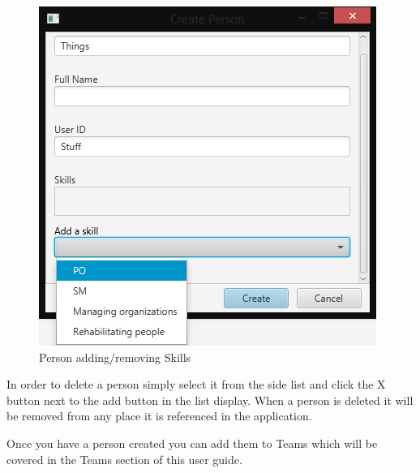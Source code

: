 \begin{figure}[H]
\centering
\includegraphics[width=\textwidth]{images/screenshots/people3.PNG}
\caption{Person adding/removing Skills}
\label{fig:new_project}
\end{figure}

In order to delete a person simply select it from the side list and click the X button next to the add button in the list display. When a person is deleted it will be removed from any place it is referenced in the application.

Once you have a person created you can add them to Teams which will be covered in the Teams section of this user guide.